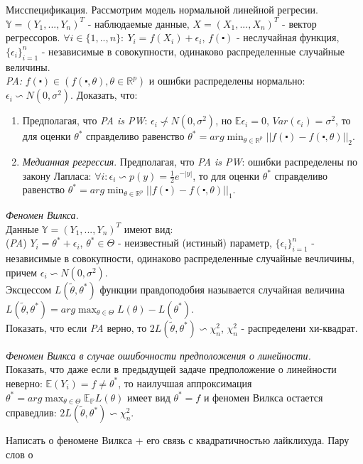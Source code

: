 \begin{problem} Мисспецификация.
Рассмотрим модель нормальной линейной регресии. $\mathbb{Y} = (Y_1,..., Y_n)^T$ - наблюдаемые данные, $X = (X_1,..., X_n)^T$ - вектор регрессоров. $\forall i \in \{1,..,n\}: ~ Y_i = f(X_i) + \epsilon_i$, $f(\centerdot)$ - неслучайная функция, $\{\epsilon_i\}_{i = 1}^n$ - независимые в совокупности, одинаково распределенные случайные величины. \\
\textit{PA:} $f(\centerdot) \in (f(\centerdot, \theta), \theta \in \mathbb{R}^p )$ и ошибки распределены нормально: $\epsilon_i \backsim N(0, \sigma^2)$.
Доказать, что:
\begin{enumerate}
\item Предполагая, что \textit{PA is PW}: $\epsilon_i \not\backsim N(0, \sigma^2)$, но $\mathbb{E}\epsilon_i = 0$, $Var(\epsilon_i) = \sigma^2$, то для оценки $\theta^*$ справделиво равенство $\theta^* =arg\min_{\theta \in \mathbb{R}^p} ||f(\centerdot) - f(\centerdot, \theta)||_2$.\\
\item \textit{Медианная регрессия}. Предполагая, что \textit{PA is PW}: ошибки распределены по закону Лапласа: $\forall i: \epsilon_i \backsim p(y) = \frac{1}{2} e^{-|y|}$, то для оценки $\theta^*$ справделиво равенство $\theta^* = arg\min_{\theta \in \mathbb{R}^p} ||f(\centerdot) - f(\centerdot, \theta)||_1$. \\
\end{enumerate}
\end{problem}

\begin{problem} \textit{Феномен Вилкса.}\\
Данные $\mathbb{Y} = (Y_1,..., Y_n)^T$ имеют вид:\\
(\textit{PA}) $Y_i = \theta^* + \epsilon_i$, $\theta^* \in \Theta$ - неизвестный (истиный) параметр, $\{\epsilon_i\}_{i=1}^n$ - независимые в совокупности, одинаково распределенные случайные вечличины, причем $\epsilon_i \backsim N(0, \sigma^2)$.\\
Эксцессом $L(\tilde{\theta}, \theta^*)$ функции правдоподобия называется случайная величина $L(\tilde{\theta}, \theta^*) = arg\max_{\theta \in \Theta}L(\theta) - L(\theta^*)$.\\
Показать, что если \textit{PA} верно, то $2L(\tilde{\theta}, \theta^*) \backsim \chi_n^2$, $\chi_n^2$ - распределени хи-квадрат. 
\end{problem}

\begin{problem} \textit{Феномен Вилкса в случае ошибочности предположения о линейности.}\\
Показать, что даже если в предыдущей задаче предположение о линейности неверно: $\mathbb{E}(Y_i) = f \not= \theta^*$, то наилучшая аппроксимация $\theta^* = arg\max_{\theta \in \Theta} \mathbb{E}_{\mathbb{P} }L(\theta)$ имеет вид $\theta^* = f$ и феномен Вилкса остается справедлив: $2L(\tilde{\theta}, \theta^*) \backsim \chi_n^2$.
\end{problem}
\begin{remark} Написать о феномене Вилкса + его связь с квадратичностью лайклихуда. Пару слов о 
\end{remark}

